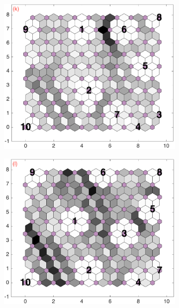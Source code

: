 \begin{figure}
\begin{subfigure}[b]{0.25\textwidth}
        \label{fig: col3and20_dist}
    \end{subfigure}        \hfill
    \begin{subfigure}[b]{0.25\textwidth}
        \centering
        \includegraphics[width=\textwidth]{../../images0.01/M31/2D/diff_dimension/combine_2D_data_between_cols3and21.png}
        \label{fig: col3and21_dist}
    \end{subfigure}
            \hfill
    \begin{subfigure}[b]{0.25\textwidth}
        \centering
        \includegraphics[width=\textwidth]{../../images0.01/M31/2D/diff_dimension/combine_2D_data_between_cols3and22.png}

\end{subfigure}
\end{figure}

